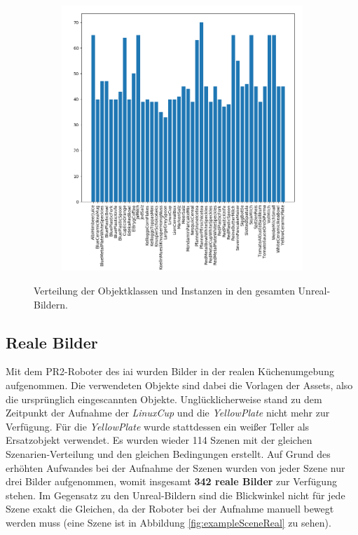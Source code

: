\begin{figure}
\begin{subfigure}[b]{0.58\textwidth}
		\includegraphics[scale=.4]{img/chapter6/UnrealGTInstance_analysis.png}	
	\end{subfigure}
\caption[Verteilung der Objekte in den Unreal-Bildern]{Verteilung der Objektklassen und Instanzen in den gesamten Unreal-Bildern.}
\label{fig:Unreal-Images_analysis}
\end{figure}

\subsection{Reale Bilder}
Mit dem PR2-Roboter des \gls{iai} wurden Bilder in der realen Küchenumgebung aufgenommen. Die verwendeten Objekte sind dabei die Vorlagen der Assets, also die ursprünglich eingescannten Objekte. Unglücklicherweise stand zu dem Zeitpunkt der Aufnahme der \textit{LinuxCup} und die \textit{YellowPlate} nicht mehr zur Verfügung. Für die \textit{YellowPlate} wurde stattdessen ein weißer Teller als Ersatzobjekt verwendet. Es wurden wieder 114 Szenen mit der gleichen Szenarien-Verteilung und den gleichen Bedingungen erstellt. Auf Grund des erhöhten Aufwandes bei der Aufnahme der Szenen wurden von jeder Szene nur drei Bilder aufgenommen, womit insgesamt \textbf{342 reale Bilder} zur Verfügung stehen. Im Gegensatz zu den Unreal-Bildern sind die Blickwinkel nicht für jede Szene exakt die Gleichen, da der Roboter bei der Aufnahme manuell bewegt werden muss (eine Szene ist in Abbildung \ref{fig:exampleSceneReal} zu sehen). \par

